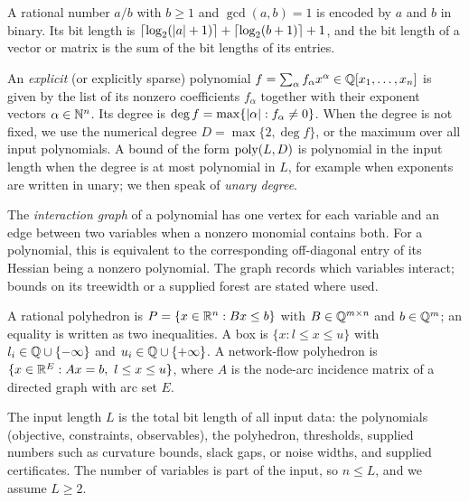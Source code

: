\begin{definition}
\label{def:models-rational}
A rational number $a/b$ with $b\ge1$ and $\gcd(a,b)=1$ is encoded by $a$ and
$b$ in binary. Its bit length is
$\lceil\log_2(\left\lvert a\right\rvert+1)\rceil+\lceil\log_2(b+1)\rceil+1$, and the bit length
of a vector or matrix is the sum of the bit lengths of its entries.
\end{definition}

\begin{definition}
\label{def:models-polynomial}
An \emph{explicit} (or explicitly sparse) polynomial
$f=\sum_\alpha f_\alpha x^\alpha\in\mathbb Q[x_1,\ldots,x_n]$ is given by the list
of its nonzero coefficients $f_\alpha$ together with their exponent vectors
$\alpha\in\mathbb N^n$. Its degree is $\deg f=\max\{\left\lvert\alpha\right\rvert:f_\alpha\ne0\}$. When
the degree is not fixed, we use the numerical degree $D=\max\{2,\deg f\}$, or
the maximum over all input polynomials. A bound of the form $\operatorname{poly}(L,D)$ is
polynomial in the input length when the degree is at most polynomial in
$L$, for example when exponents are written in unary; we then speak of
\emph{unary degree}.
\end{definition}

The \emph{interaction graph} of a polynomial has one vertex for each
variable and an edge between two variables when a nonzero monomial contains
both. For a polynomial, this is equivalent to the corresponding off-diagonal
entry of its Hessian being a nonzero polynomial. The graph records which
variables interact; bounds on its treewidth or a supplied forest are stated
where used.

\begin{definition}[Polyhedra]
\label{def:models-polyhedra}
A rational polyhedron is $P=\{x\in\mathbb R^n:Bx\le b\}$ with $B\in\mathbb Q^{m\times n}$
and $b\in\mathbb Q^m$; an equality is written as two inequalities. A box is
$\{x:l\le x\le u\}$ with $l_i\in\mathbb Q\cup\{-\infty\}$ and
$u_i\in\mathbb Q\cup\{+\infty\}$. A network-flow polyhedron is
$\{x\in\R^E:Ax=b,\ l\le x\le u\}$, where $A$ is the node-arc incidence
matrix of a directed graph with arc set $E$.
\end{definition}

\begin{definition}
\label{def:models-length}
The input length $L$ is the total bit length of all input data: the
polynomials (objective, constraints, observables), the polyhedron,
thresholds, supplied numbers such as curvature bounds, slack gaps, or noise
widths, and supplied certificates. The number of variables is part of the
input, so $n\le L$, and we assume $L\ge2$.
\end{definition}

